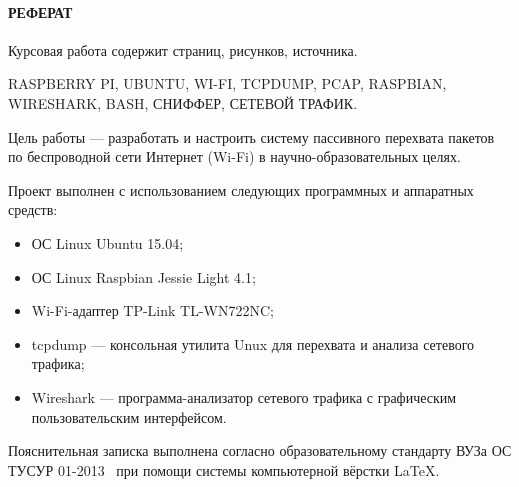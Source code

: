 \newpage
{}
\paragraph{\hfill РЕФЕРАТ \hfill}
Курсовая работа содержит  страниц,  рисунков,  источника.

RASPBERRY PI, UBUNTU, WI-FI, TCPDUMP, PCAP, RASPBIAN, WIRESHARK, BASH, СНИФФЕР, СЕТЕВОЙ ТРАФИК.

Цель работы --- разработать и настроить систему пассивного перехвата пакетов по беспроводной сети Интернет (Wi-Fi) в научно-образовательных целях.

Проект выполнен с использованием следующих программных и аппаратных средств:
\begin{itemize}
  \item ОС Linux Ubuntu 15.04;
  \item ОС Linux Raspbian Jessie Light 4.1;
  \item Wi-Fi-адаптер TP-Link TL-WN722NC;
  \item tcpdump --- консольная утилита Unux для перехвата и анализа сетевого трафика;
  \item Wireshark --- программа-анализатор сетевого трафика с графическим пользовательским интерфейсом. 
\end{itemize}

Пояснительная записка выполнена согласно образовательному стандарту ВУЗа ОС ТУСУР 01-2013~\cite{os_tusur} при помощи системы компьютерной вёрстки \LaTeX.

